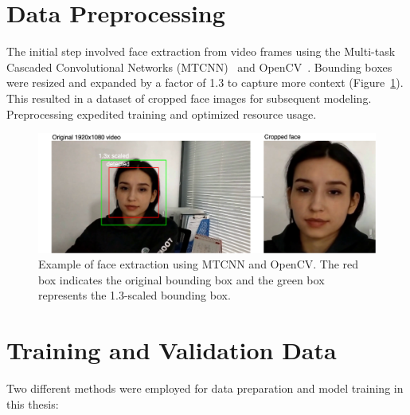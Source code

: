\documentclass[a4paper,12pt,openright]{book}
\begin{document}
\newpage

\section{Data Preprocessing}

The initial step involved face extraction from video frames using the Multi-task Cascaded Convolutional Networks (MTCNN)~\cite{DBLP:journals/corr/ZhangZL016} and OpenCV~\cite{opencv_library}. Bounding boxes were resized and expanded by a factor of 1.3 to capture more context (Figure~\ref{fig:MTCCN}). This resulted in a dataset of cropped face images for subsequent modeling. Preprocessing expedited training and optimized resource usage.


\begin{figure}[H]
    \centering
    \includegraphics[trim={2cm 0cm 0cm 0cm},clip,width=\textwidth]{images/resultof.png}
    \caption{Example of face extraction using MTCNN and OpenCV. The red box indicates the original bounding box and the green box represents the 1.3-scaled bounding box.}

    \label{fig:MTCCN}
\end{figure}


\section{Training and Validation Data}

Two different methods were employed for data preparation and model training in this thesis:
\end{document}
